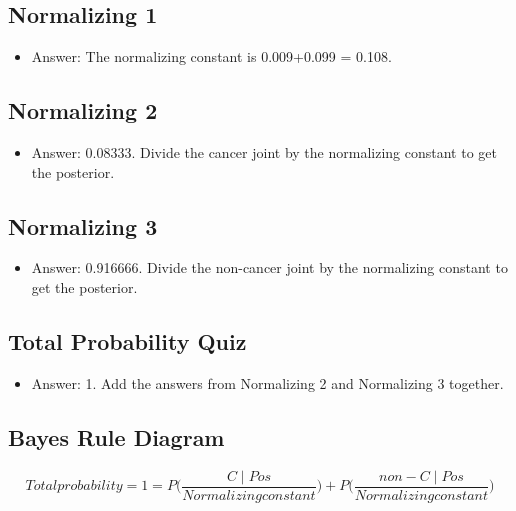 \documentclass[12pt]{report}
\begin{document}
\subsection{Normalizing 1}

\begin{itemize}

\item Answer: The normalizing constant is 0.009+0.099 = 0.108. 

\end{itemize}

\subsection{Normalizing 2}

\begin{itemize}

\item Answer: 0.08333. Divide the cancer joint by the normalizing constant to get the posterior. 

\end{itemize}

\subsection{Normalizing 3}

\begin{itemize}

\item Answer: 0.916666. Divide the non-cancer joint by the normalizing constant to get the posterior. 

\end{itemize}

\subsection{Total Probability Quiz}

\begin{itemize}

\item Answer: 1. Add the answers from Normalizing 2 and Normalizing 3 together.

\end{itemize}

\subsection{Bayes Rule Diagram}

\begin{equation}
Total probability = 1 = P \big( \frac{C \mid Pos}{Normalizing constant} \big) + P\big( \frac{non-C \mid Pos}{Normalizing constant} \big)
\end{equation}
\end{document}
